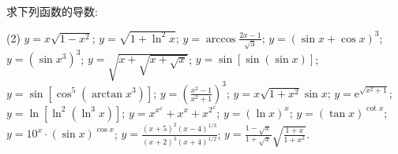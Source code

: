 \begin{exercise}[3.1.7]
    求下列函数的导数:
    \begin{tasks}[label=(\arabic*)](2)
        \task $y = x\sqrt{1-x^2}$;
        \task $y = \sqrt{1+\ln^2 x}$;
        \task $y = \arccos\frac{2x-1}{\sqrt{3}}$;
        \task $y = (\sin x + \cos x)^3$;
        \task $y = (\sin x^3)^3$;
        \task $y = \sqrt{x+\sqrt{x+\sqrt{x}}}$;
        \task $y = \sin[\sin(\sin x)]$;
        \task $y = \sin[\cos^5(\arctan x^3)]$;
        \task $y = \left(\frac{x^2-1}{x^2+1}\right)^3$;
        \task $y = x\sqrt{1+x^2}\sin x$;
        \task $y = \mathrm{e}^{\sqrt{x^2+1}}$;
        \task $y = \ln[\ln^2(\ln^3 x)]$;
        \task $y = x^{x^x}+x^{x}+x^{2^x}$;
        \task $y = (\ln x)^x$;
        \task $y = (\tan x)^{\cot x}$;
        \task $y = 10^x \cdot (\sin x)^{\cos x}$;
        \task $y = \frac{(x+5)^2(x-4)^{1/3}}{(x+2)^3(x+4)^{1/2}}$;
        \task $y = \frac{1-\sqrt{x}}{1+\sqrt{x}}\sqrt{\frac{1+x}{1+x^2}}$.
    \end{tasks}
\end{exercise}

